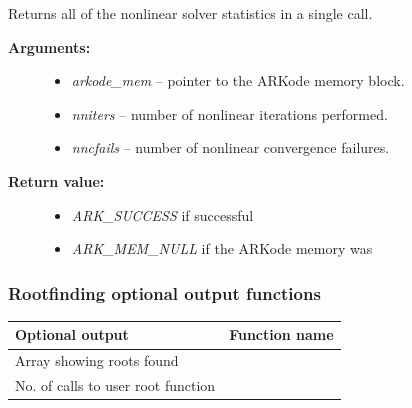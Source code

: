 \documentclass[letterpaper,10pt,english]{sphinxmanual}
\begin{document}
\begin{fulllineitems}
\label{c_interface/User_callable:c.ARKodeGetNonlinSolvStats}
Returns all of the nonlinear solver statistics in a single call.
\begin{description}
\item[{\textbf{Arguments:}}] \leavevmode\begin{itemize}
\item {} 
\emph{arkode\_mem} -- pointer to the ARKode memory block.

\item {} 
\emph{nniters} -- number of nonlinear iterations performed.

\item {} 
\emph{nncfails} -- number of nonlinear convergence failures.

\end{itemize}

\item[{\textbf{Return value:}}] \leavevmode\begin{itemize}
\item {} 
\emph{ARK\_SUCCESS} if successful

\item {} 
\emph{ARK\_MEM\_NULL} if the ARKode memory was 

\end{itemize}

\end{description}

\end{fulllineitems}



\subsubsection{Rootfinding optional output functions}
\label{c_interface/User_callable:rootfinding-optional-output-functions}\label{c_interface/User_callable:cinterface-arkoderootoutputs}
\begin{tabulary}{\linewidth}{|L|L|}
\hline
\textsf{\relax 
Optional output
} & \textsf{\relax 
Function name
}\\
\hline
Array showing roots found
 & 
{\hyperref[c_interface/User_callable:c.ARKodeGetRootInfo]{\emph{}}}
\\
\hline
No. of calls to user root function
 & 
{\hyperref[c_interface/User_callable:c.ARKodeGetNumGEvals]{\emph{}}}
\\
\hline\end{tabulary}
\end{document}
